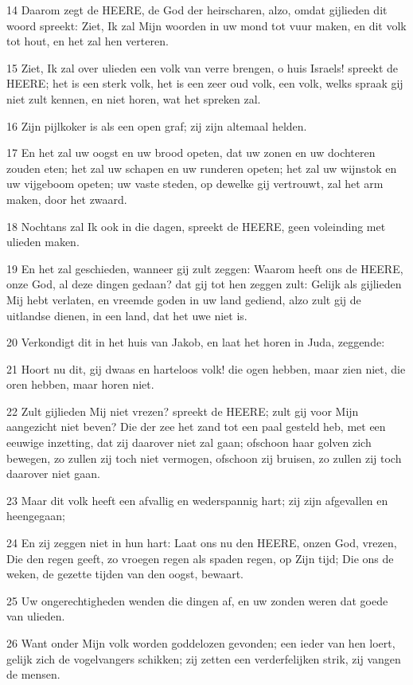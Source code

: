 \par 14 Daarom zegt de HEERE, de God der heirscharen, alzo, omdat gijlieden dit woord spreekt: Ziet, Ik zal Mijn woorden in uw mond tot vuur maken, en dit volk tot hout, en het zal hen verteren.
\par 15 Ziet, Ik zal over ulieden een volk van verre brengen, o huis Israels! spreekt de HEERE; het is een sterk volk, het is een zeer oud volk, een volk, welks spraak gij niet zult kennen, en niet horen, wat het spreken zal.
\par 16 Zijn pijlkoker is als een open graf; zij zijn altemaal helden.
\par 17 En het zal uw oogst en uw brood opeten, dat uw zonen en uw dochteren zouden eten; het zal uw schapen en uw runderen opeten; het zal uw wijnstok en uw vijgeboom opeten; uw vaste steden, op dewelke gij vertrouwt, zal het arm maken, door het zwaard.
\par 18 Nochtans zal Ik ook in die dagen, spreekt de HEERE, geen voleinding met ulieden maken.
\par 19 En het zal geschieden, wanneer gij zult zeggen: Waarom heeft ons de HEERE, onze God, al deze dingen gedaan? dat gij tot hen zeggen zult: Gelijk als gijlieden Mij hebt verlaten, en vreemde goden in uw land gediend, alzo zult gij de uitlandse dienen, in een land, dat het uwe niet is.
\par 20 Verkondigt dit in het huis van Jakob, en laat het horen in Juda, zeggende:
\par 21 Hoort nu dit, gij dwaas en harteloos volk! die ogen hebben, maar zien niet, die oren hebben, maar horen niet.
\par 22 Zult gijlieden Mij niet vrezen? spreekt de HEERE; zult gij voor Mijn aangezicht niet beven? Die der zee het zand tot een paal gesteld heb, met een eeuwige inzetting, dat zij daarover niet zal gaan; ofschoon haar golven zich bewegen, zo zullen zij toch niet vermogen, ofschoon zij bruisen, zo zullen zij toch daarover niet gaan.
\par 23 Maar dit volk heeft een afvallig en wederspannig hart; zij zijn afgevallen en heengegaan;
\par 24 En zij zeggen niet in hun hart: Laat ons nu den HEERE, onzen God, vrezen, Die den regen geeft, zo vroegen regen als spaden regen, op Zijn tijd; Die ons de weken, de gezette tijden van den oogst, bewaart.
\par 25 Uw ongerechtigheden wenden die dingen af, en uw zonden weren dat goede van ulieden.
\par 26 Want onder Mijn volk worden goddelozen gevonden; een ieder van hen loert, gelijk zich de vogelvangers schikken; zij zetten een verderfelijken strik, zij vangen de mensen.
